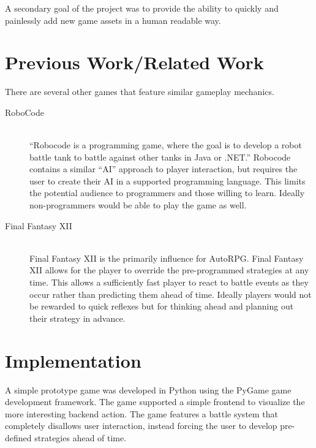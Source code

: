 \documentclass[11pt]{article}
\begin{document}
A secondary goal of the project was to provide the ability to quickly and painlessly add new game assets in a human readable way.

\section{Previous Work/Related Work}

There are several other games that feature similar gameplay mechanics.  

\begin{description}
\item[RoboCode \cite{RoboCode}] \hfill \\
      ``Robocode is a programming game, where the goal is to develop a robot battle tank to battle against other tanks in Java or .NET.'' Robocode contains a similar ``AI'' approach to player interaction, but requires the user to create their AI in a supported programming language.  This limits the potential audience to programmers and those willing to learn.  Ideally non-programmers would be able to play the game as well.

\item[Final Fantasy XII \cite{Gambits}] \hfill \\
      Final Fantasy XII is the primarily influence for AutoRPG. Final Fantasy XII allows for the player to override the pre-programmed strategies at any time.  This allows a sufficiently fast player to react to battle events as they occur rather than predicting them ahead of time.  Ideally players would not be rewarded to quick reflexes but for thinking ahead and planning out their strategy in advance.

\end{description}


\section{Implementation}

A simple prototype game was developed in Python using the PyGame game development framework.  The game supported a simple frontend to visualize the more interesting backend action. The game features a battle system that completely disallows user interaction, instead forcing the user to develop pre-defined strategies ahead of time.
\end{document}
